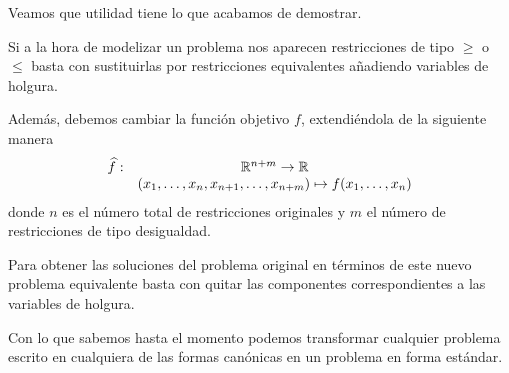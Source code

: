 Veamos que utilidad tiene lo que acabamos de demostrar.
\begin{obs}[Aplicación]
	Si a la hora de modelizar un problema nos aparecen restricciones de tipo $\geq$ o $\leq$ basta con sustituirlas por restricciones equivalentes añadiendo variables de holgura.
	
	Además, debemos cambiar la función objetivo $f$, extendiéndola de la siguiente manera
	\begin{equation*}
		\begin{array}{cc}
		\widehat{f}:&\mathbb{R}^{n+m}\to \mathbb{R}\\
		& (x_1,\dots,x_n,x_{n+1},\dots,x_{n+m})\mapsto f(x_1,\dots,x_n)
		\end{array}
	\end{equation*}
	donde $n$ es el número total de restricciones originales y $m$ el número de restricciones de tipo desigualdad.
	 
	Para obtener las soluciones del problema original en términos de este nuevo problema equivalente basta con quitar las componentes correspondientes a las variables de holgura.
\end{obs}
Con lo que sabemos hasta el momento podemos transformar cualquier problema escrito en cualquiera de las formas canónicas en un problema en forma estándar.

